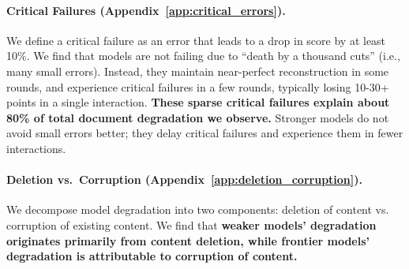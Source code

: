 \documentclass{article} %
\begin{document}
\paragraph{Critical Failures (Appendix~\ref{app:critical_errors}).} We define a critical failure as an error that leads to a drop in score by at least 10\%. We find that models are not failing due to ``death by a thousand cuts'' (i.e., many small errors). Instead, they maintain near-perfect reconstruction in some rounds, and experience critical failures in a few rounds, typically losing 10-30+ points in a single interaction. \textbf{These sparse critical failures explain about 80\% of total document degradation we observe.} Stronger models do not avoid small errors better; they delay critical failures and experience them in fewer interactions.

\paragraph{Deletion vs.\ Corruption (Appendix~\ref{app:deletion_corruption}).} We decompose model degradation into two components: deletion of content vs. corruption of existing content. We find that \textbf{weaker models' degradation originates primarily from content deletion, while frontier models' degradation is attributable to corruption of content.}





\end{document}

